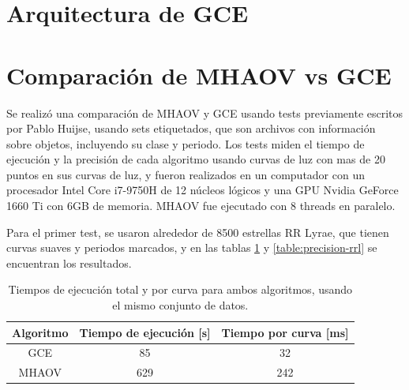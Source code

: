 \section{Arquitectura de GCE}\label{sec:gce}
\section{Comparación de MHAOV vs GCE}\label{sec:mhaov-vs-gce}
Se realizó una comparación de MHAOV y GCE usando tests previamente escritos por Pablo Huijse, usando sets etiquetados, que son archivos con información sobre objetos, incluyendo su clase y periodo. Los tests miden el tiempo de ejecución y la precisión de cada algoritmo usando curvas de luz con mas de 20 puntos en sus curvas de luz, y fueron realizados en un computador con un procesador Intel Core i7-9750H de 12 núcleos lógicos y una GPU Nvidia GeForce 1660 Ti con 6GB de memoria. MHAOV fue ejecutado con $8$ threads en paralelo.

Para el primer test, se usaron alrededor de 8500 estrellas RR Lyrae, que tienen curvas suaves y periodos marcados, y en las tablas \ref{table:tiempos-rrl} y \ref{table:precision-rrl} se encuentran los resultados.
\begin{table}[H]
\caption{Tiempos de ejecución total y por curva para ambos algoritmos, usando el mismo conjunto de datos.}
    \begin{tabular}{|c|c|c|}
    \hline
    Algoritmo & Tiempo de ejecución {[}s{]} & Tiempo por curva {[}ms{]} \\ \hline
    GCE       & 85                          & 32                        \\ \hline
    MHAOV     & 629                         & 242                       \\ \hline
    \end{tabular}
    \label{table:tiempos-rrl}
\end{table}

